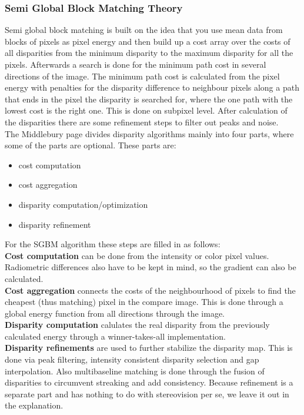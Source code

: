 \documentclass[a4paper]{article}
\begin{document}
\subsubsection{Semi Global Block Matching Theory}
Semi global block matching is built on the idea that you use mean data
from blocks of pixels as pixel energy and then build up a cost array
over the costs of all disparities from the minimum disparity to the
maximum disparity for all the pixels. Afterwards a search is done for
the minimum path cost in several directions of the image. The minimum
path cost is calculated from the pixel energy with penalties for the
disparity difference to neighbour pixels along a path that ends in the
pixel the disparity is searched for, where the one path with the
lowest cost is the right one. This is done on
subpixel level. After calculation of the disparities there are some
refinement steps to filter out peaks and noise.\\
The Middlebury page divides disparity algorithms mainly into four
parts, where some of the parts are optional. These parts are:
\begin{itemize}
\item cost computation
\item cost aggregation
\item disparity computation/optimization
\item disparity refinement
\end{itemize}
\noindent For the SGBM algorithm these steps are filled in as follows:\\
\textbf{Cost computation} can be done from the intensity or color
pixel values. Radiometric differences also have to be kept in mind, so
the gradient can also be calculated.\\
\textbf{Cost aggregation} connects the costs of the neighbourhood of
pixels to find the cheapest (thus matching) pixel in the compare
image. This is done through a global energy function from all
directions through the image.\\
\textbf{Disparity computation} calulates the real disparity from the
previously calculated energy through a winner-takes-all
implementation.\\
\textbf{Disparity refinements} are used to further stabilize the
disparity map. This is done via peak filtering, intensity consistent
disparity selection and gap interpolation. Also multibaseline matching
is done through the fusion of disparities to circumvent streaking and
add consistency. Because refinement is a separate part and has nothing
to do with stereovision per se, we leave it out in the explanation.\\
\end{document}
